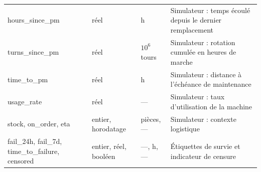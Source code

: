 \documentclass[11pt,a4paper,oneside]{report}
\begin{document}
\begin{tabularx}{\linewidth}{@{}P{3.0cm} P{2.3cm} P{1.5cm} L@{}}
hours\_since\_pm & réel & h & Simulateur : temps écoulé depuis le dernier remplacement \\
turns\_since\_pm & réel & $10^6$ tours & Simulateur : rotation cumulée en heures de marche \\
time\_to\_pm & réel & h & Simulateur : distance à l'échéance de maintenance \\
usage\_rate & réel & --- & Simulateur : taux d'utilisation de la machine \\
stock, on\_order, eta & entier, horodatage & pièces, --- & Simulateur : contexte logistique \\
fail\_24h, fail\_7d, time\_to\_failure, censored & entier, réel, booléen & ---, h, --- & Étiquettes de survie et indicateur de censure \\
\bottomrule
\end{tabularx}
\end{document}
